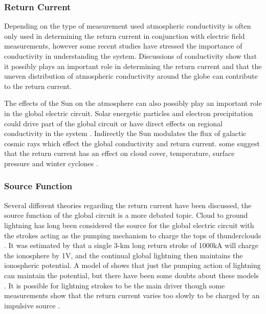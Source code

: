 \documentclass[12pt, letterpaper, onecolumn, oneside]{article}
\begin{document}
\subsubsection*{Return Current}

Depending on the type of measurement used atmospheric conductivity is often only used in determining the return current in conjunction with electric field measurements, however some recent studies \citep{Rycroft2008} have stressed the importance of conductivity in understanding the system. Discussions of conductivity show that it possibly plays an important role in determining the return current and that the uneven distribution of atmospheric conductivity around the globe can contribute to the return current.


The effects of the Sun on the atmosphere can also possibly  play an important role in the global electric circuit. Solar energetic particles and electron precipitation could drive part of the global circuit or have direct effects on regional conductivity in the system \citep{Tinsley2007}. Indirectly the Sun modulates the flux of galactic cosmic rays which effect the global conductivity and return current. some suggest that the return current has an effect on cloud cover, temperature, surface pressure and winter cyclones \citep{Kniveton2008,Tinsley2007}.

\subsubsection*{Source Function}

Several different theories regarding the return current have been discussed, the source function of the global circuit is a more debated topic. Cloud to ground lightning has long been considered the source for the global electric circuit with the strokes acting as the pumping mechanism to charge the tops of thunderclouds \citep{Roble1986}. It was estimated by \citet{Wait1960} that a single 3-km long return stroke of 1000kA will charge the ionosphere by 1V, and the continual global lightning then maintains the ionospheric potential. A model of \citet{Anderson1969} shows that just the pumping action of lightning can maintain the potential, but there have been some doubts about these models \citep{Hill1971}. It is possible for lightning strokes to be the main driver though some measurements show that the return current varies too slowly to be charged by an impulsive source \citep{Krider1982}.
\end{document}
